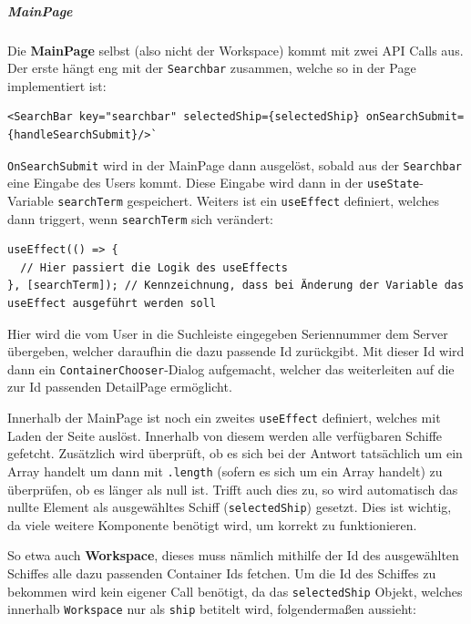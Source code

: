 \documentclass[
    headings=optiontotocandhead,%
    twoside,
    numbers=noenddot,%
    12pt, %
    titlepage, %
    parskip=full, %
    listof=leveldown, 
    numbers=noenddot, %
    a4paper,DIV=14,
    BCOR=15mm,
]{scrbook}
\newcommand{\passthrough}[1]{#1}
\begin{document}
\hypertarget{mainpage}{%
\subparagraph{MainPage}\label{mainpage}}

Die \textbf{MainPage} selbst (also nicht der Workspace) kommt mit zwei
API Calls aus. Der erste hängt eng mit der
\passthrough{\lstinline!Searchbar!} zusammen, welche so in der Page
implementiert ist:

\begin{lstlisting}[caption={Searchbar Implementierung in der MainPAge}]
<SearchBar key="searchbar" selectedShip={selectedShip} onSearchSubmit={handleSearchSubmit}/>`
\end{lstlisting}

\passthrough{\lstinline!OnSearchSubmit!} wird in der MainPage dann
ausgelöst, sobald aus der \passthrough{\lstinline!Searchbar!} eine
Eingabe des Users kommt. Diese Eingabe wird dann in der
\passthrough{\lstinline!useState!}-Variable
\passthrough{\lstinline!searchTerm!} gespeichert. Weiters ist ein
\passthrough{\lstinline!useEffect!} definiert, welches dann triggert,
wenn \passthrough{\lstinline!searchTerm!} sich verändert:

\begin{lstlisting}[caption={Kennzeichnung eines Trigger eines useEffect}]
useEffect(() => {
  // Hier passiert die Logik des useEffects
}, [searchTerm]); // Kennzeichnung, dass bei Änderung der Variable das useEffect ausgeführt werden soll
\end{lstlisting}

Hier wird die vom User in die Suchleiste eingegeben Seriennummer dem
Server übergeben, welcher daraufhin die dazu passende Id zurückgibt. Mit
dieser Id wird dann ein
\passthrough{\lstinline!ContainerChooser!}-Dialog aufgemacht, welcher
das weiterleiten auf die zur Id passenden DetailPage ermöglicht.

Innerhalb der MainPage ist noch ein zweites
\passthrough{\lstinline!useEffect!} definiert, welches mit Laden der
Seite auslöst. Innerhalb von diesem werden alle verfügbaren Schiffe
gefetcht. Zusätzlich wird überprüft, ob es sich bei der Antwort
tatsächlich um ein Array handelt um dann mit
\passthrough{\lstinline!.length!} (sofern es sich um ein Array handelt)
zu überprüfen, ob es länger als null ist. Trifft auch dies zu, so wird
automatisch das nullte Element als ausgewähltes Schiff
(\passthrough{\lstinline!selectedShip!}) gesetzt. Dies ist wichtig, da
viele weitere Komponente benötigt wird, um korrekt zu funktionieren.

So etwa auch \textbf{Workspace}, dieses muss nämlich mithilfe der Id des
ausgewählten Schiffes alle dazu passenden Container Ids fetchen. Um die
Id des Schiffes zu bekommen wird kein eigener Call benötigt, da das
\passthrough{\lstinline!selectedShip!} Objekt, welches innerhalb
\passthrough{\lstinline!Workspace!} nur als
\passthrough{\lstinline!ship!} betitelt wird, folgendermaßen aussieht:
\end{document}
